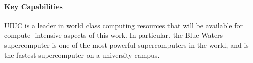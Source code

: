 \documentclass[letterpaper,12pt]{article}
\begin{document}
\paragraph{Key Capabilities}

UIUC is a leader in world class computing resources that will be available for compute-
intensive aspects of this work. In particular, the Blue Waters supercomputer is
one of the most powerful supercomputers in the world, and is the fastest
supercomputer on a university campus.


\end{document}
